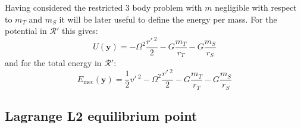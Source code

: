 Having considered the restricted 3 body problem with $m$ negligible with respect to $m_T$ and $m_S$ it will be later useful to define the energy per mass. For the potential in $\mathcal{R}'$ this gives:
\begin{equation}
    U(\mathbf{y}) = - \Omega^2 \frac{r'\,^2}{2} - G \frac{m_T}{r_T} - G \frac{m_S}{r_S}
    \label{eq:pot_per_mass}
\end{equation}
and for the total energy in $\mathcal{R}'$:
\begin{equation}
    E_\mathrm{mec}(\mathbf{y}) = \frac{1}{2}v'\,^2 - \Omega^2\frac{r'\,^2}{2} - G \frac{m_T}{r_T} - G \frac{m_S}{r_S}
\end{equation}


\subsection{Lagrange L2 equilibrium point}
\label{sec:lagrange_L2}

